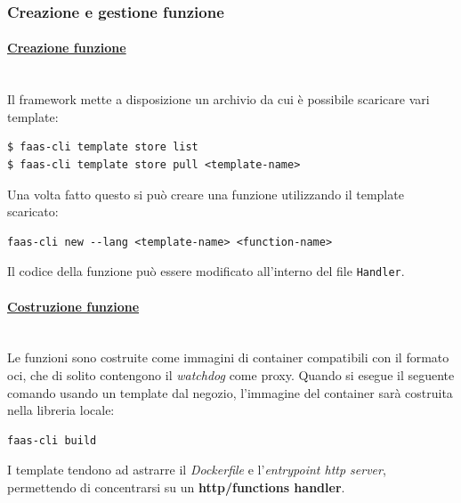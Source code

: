 \documentclass[12pt,a4paper,openany,twoside]{book}
\begin{document}
\subsubsection{Creazione e gestione funzione}

\paragraph{\underline{Creazione funzione}} ~\\
Il framework mette a disposizione un archivio da cui è possibile scaricare vari template:
\begin{lstlisting}
$ faas-cli template store list
$ faas-cli template store pull <template-name>\end{lstlisting}
Una volta fatto questo si può creare una funzione utilizzando il template scaricato:
\begin{lstlisting}
faas-cli new --lang <template-name> <function-name>\end{lstlisting}
Il codice della funzione può essere modificato all'interno del file \texttt{Handler}.

\paragraph{\underline{Costruzione funzione}} ~\\
Le funzioni sono costruite come immagini di container compatibili con il formato \ac{oci}, che di solito contengono il \textit{watchdog} come proxy. Quando si esegue il seguente comando usando un template dal negozio, l'immagine del container sarà costruita nella libreria locale:
\begin{lstlisting}
faas-cli build\end{lstlisting}
I template tendono ad astrarre il \textit{Dockerfile} e l'\textit{entrypoint \ac{http} server}, permettendo di concentrarsi su un \textbf{\ac{http}/functions handler}.
\end{document}
